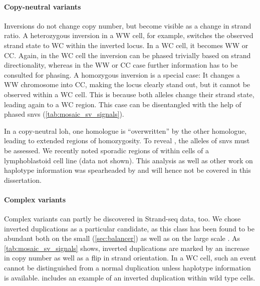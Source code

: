 \paragraph{Copy-neutral variants}
Inversions do not change copy number, but become visible as a change in strand
ratio. A heterozygous inversion in a WW cell, for example, switches the observed strand
state to WC within the inverted locus. In a WC cell, it becomes WW or CC. Again,
in the WC cell the inversion can be phased trivially based on strand
directionality, whereas in the WW or CC case further \snv information has to be
consulted for phasing. A homozygous inversion is a special case: It changes a WW
chromosome into CC, making the locus clearly stand out, but it cannot be
observed within a WC cell. This is because both alleles change their strand
state, leading again to a WC region. This case can be disentangled with the help
of phased \acp{snv} (\cref{tab:mosaic_sv_signals}).

In a copy-neutral \acl{loh}, one homologue is
``overwritten'' by the other homologue, leading to extended regions of
homozygosity. To reveal \loh, the alleles of \acp{snv} must be assessed. We recently
noted sporadic regions of \loh within cells of a lymphoblastoid cell
line (data not shown). This analysis as well as other work on haplotype information
was spearheaded by \david and will hence not be covered in this
dissertation.

\paragraph{Complex variants}
Complex variants can partly be discovered in Strand-seq data, too. We chose
inverted duplications as a particular candidate, as this class has been found to
be abundant both on the small (\cref{sec:balancer}) as well as on the large
scale \citep{Chaisson2017}. As \cref{tab:mosaic_sv_signals} shows, inverted
duplications are marked by an increase in copy number as well as a flip in
strand orientation. In a WC cell, such an event cannot be distinguished from a
normal duplication unless haplotype information is available. 
includes an example of an inverted duplication within  wild type cells.

